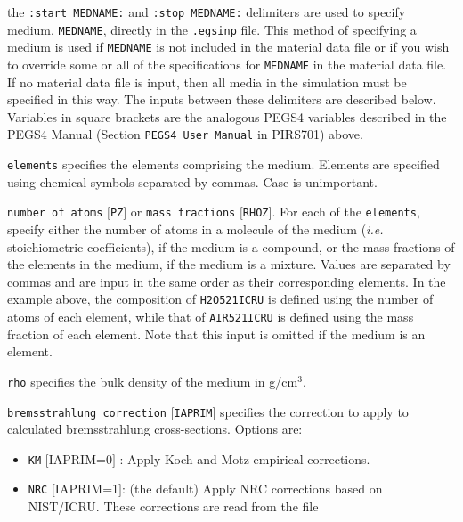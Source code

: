 \documentclass[12pt,twoside]{article}
\begin{document}
\begin{description}
\item the {\tt :start MEDNAME:} and {\tt :stop MEDNAME:} delimiters are used to specify medium, {\tt MEDNAME}, directly in the
{\tt .egsinp} file.  This method of specifying a medium is used if {\tt MEDNAME} is not included in the material data file or
if you wish to override some or all of the specifications for {\tt MEDNAME} in the material data file.
If no material data file is input, then all media in the simulation
must be specified in this way.  The inputs between these delimiters are described below.  Variables
in square brackets are the analogous PEGS4 variables described in the PEGS4 Manual (Section {\tt PEGS4 User Manual} in PIRS701) above.
\begin{description}
\item {\tt elements} specifies the elements comprising the medium.  Elements are specified using chemical symbols separated by
commas.  Case is unimportant.
\item {\tt number of atoms} $[${\tt PZ}$]$ or {\tt mass fractions} $[${\tt RHOZ}$]$.  For each of the {\tt elements}, specify either the number of atoms in a molecule of the medium ({\it i.e.} stoichiometric coefficients), if the
medium is a compound, or the mass fractions of the elements in the medium,
if the medium is a mixture.
Values are separated by commas and are input in the same order as their corresponding elements.  In the example above,
the composition of {\tt H2O521ICRU} is
defined using the number of atoms of each element, while that of {\tt AIR521ICRU} is defined using the mass fraction of each element.  Note that this input
is omitted if the medium is an element.
\item {\tt rho} specifies the bulk density of the medium in g/cm$^3$.
\item {\tt bremsstrahlung correction} $[${\tt IAPRIM}$]$ specifies the
correction to apply to calculated bremsstrahlung cross-sections.
Options are:
\begin{itemize}
\item {\tt KM} $[$IAPRIM=0$]$ : Apply Koch and Motz\cite{KM59} empirical corrections.
\item {\tt NRC} $[$IAPRIM=1$]$: (the default) Apply NRC corrections based on NIST/ICRU\cite{Ro89a}.  These corrections are read from the file

\end{itemize}
\end{description}
\end{description}
\end{document}

